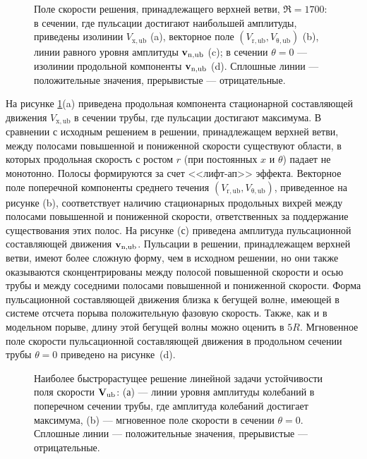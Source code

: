 \begin{figure}
\caption{Поле скорости решения, принадлежащего верхней ветви, $\Re = 1700$: в сечении, где пульсации достигают наибольшей амплитуды, приведены изолинии $V_\mathrm{x,ub}$ (a), векторное поле $(V_\mathrm{r,ub}, V_\mathrm{\theta,ub})$ (b), линии равного уровня амплитуды $\mathbf{v}_\mathrm{n,ub}$ (c); в сечении $\theta = 0$ --- изолинии продольной компоненты $\mathbf{v}_\mathrm{n,ub}$ (d). Сплошные линии --- положительные значения, прерывистые --- отрицательные.}
\label{local_ub_means_pic}
\end{figure}

На рисунке \ref{local_ub_means_pic}(a) приведена продольная компонента стационарной составляющей движения $V_\mathrm{x,ub}$ в сечении трубы, где пульсации достигают максимума. В сравнении с исходным решением в решении, принадлежащем верхней ветви, между полосами повышенной и пониженной скорости существуют области, в которых продольная скорость с ростом $r$ (при постоянных $x$ и $\theta$) падает не монотонно. Полосы формируются за счет <<лифт-ап>> эффекта. Векторное поле поперечной компоненты среднего течения $(V_\mathrm{r,ub}, V_\mathrm{\theta,ub})$, приведенное на рисунке (b), соответствует наличию стационарных продольных вихрей между полосами повышенной и пониженной скорости, ответственных за поддержание существования этих полос. На рисунке (с) приведена амплитуда пульсационной составляющей движения $\mathbf{v}_\mathrm{n,ub}$. Пульсации в решении, принадлежащем верхней ветви, имеют более сложную форму, чем в исходном решении, но они также оказываются сконцентрированы между полосой повышенной скорости и осью трубы и между соседними полосами повышенной и пониженной скорости. Форма пульсационной составляющей движения близка к бегущей волне, имеющей в системе отсчета порыва положительную фазовую скорость. Также, как и в модельном порыве, длину этой бегущей волны можно оценить в $5R$. Мгновенное поле скорости пульсационной составляющей движения в продольном сечении трубы $\theta = 0$ приведено на рисунке~(d).  


\begin{figure}
\caption{Наиболее быстрорастущее решение линейной задачи устойчивости поля скорости $\mathbf{V}_\mathrm{ub}$:  (а) --- линии уровня амплитуды колебаний в поперечном сечении трубы, где амплитуда колебаний достигает максимума, (b) --- мгновенное поле скорости в сечении $\theta = 0$. Сплошные линии --- положительные значения, прерывистые --- отрицательные.}
\label{ub_lin_pic}
\end{figure}

